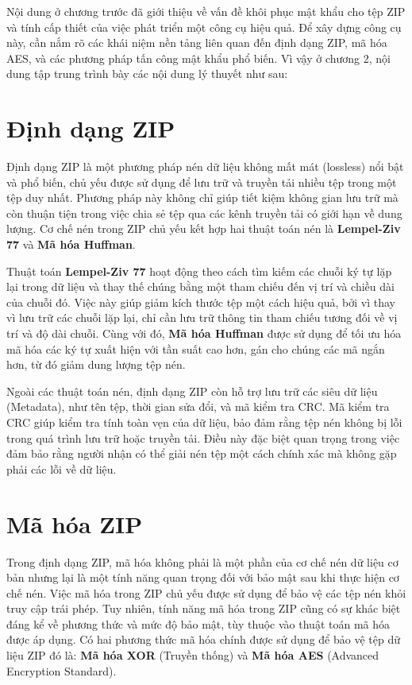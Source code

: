 \documentclass[../DoAn.tex]{subfiles}
\begin{document}
Nội dung ở chương trước đã giới thiệu về vấn đề khôi phục mật khẩu cho tệp ZIP và tính cấp thiết của việc phát triển một công cụ hiệu quả. Để xây dựng công cụ này, cần nắm rõ các khái niệm nền tảng liên quan đến định dạng ZIP, mã hóa AES, và các phương pháp tấn công mật khẩu phổ biến. Vì vậy ở chương 2, nội dung tập trung trình bày các nội dung lý thuyết như sau:

\section{Định dạng ZIP}
\label{section:2.1}
Định dạng ZIP là một phương pháp nén dữ liệu không mất mát (lossless) nổi bật và phổ biến, chủ yếu được sử dụng để lưu trữ và truyền tải nhiều tệp trong một tệp duy nhất. Phương pháp này không chỉ giúp tiết kiệm không gian lưu trữ mà còn thuận tiện trong việc chia sẻ tệp qua các kênh truyền tải có giới hạn về dung lượng. Cơ chế nén trong ZIP chủ yếu kết hợp hai thuật toán nén là \textbf{Lempel-Ziv 77} và \textbf{Mã hóa Huffman}. 

Thuật toán \textbf{Lempel-Ziv 77} hoạt động theo cách tìm kiếm các chuỗi ký tự lặp lại trong dữ liệu và thay thế chúng bằng một tham chiếu đến vị trí và chiều dài của chuỗi đó. Việc này giúp giảm kích thước tệp một cách hiệu quả, bởi vì thay vì lưu trữ các chuỗi lặp lại, chỉ cần lưu trữ thông tin tham chiếu tương đối về vị trí và độ dài chuỗi. Cùng với đó, \textbf{Mã hóa Huffman} được sử dụng để tối ưu hóa mã hóa các ký tự xuất hiện với tần suất cao hơn, gán cho chúng các mã ngắn hơn, từ đó giảm dung lượng tệp nén. 

Ngoài các thuật toán nén, định dạng ZIP còn hỗ trợ lưu trữ các siêu dữ liệu (Metadata), như tên tệp, thời gian sửa đổi, và mã kiểm tra CRC. Mã kiểm tra CRC giúp kiểm tra tính toàn vẹn của dữ liệu, bảo đảm rằng tệp nén không bị lỗi trong quá trình lưu trữ hoặc truyền tải. Điều này đặc biệt quan trọng trong việc đảm bảo rằng người nhận có thể giải nén tệp một cách chính xác mà không gặp phải các lỗi về dữ liệu.

\section{Mã hóa ZIP}
\label{section:2.2}
Trong định dạng ZIP, mã hóa không phải là một phần của cơ chế nén dữ liệu cơ bản nhưng lại là một tính năng quan trọng đối với bảo mật sau khi thực hiện cơ chế nén. Việc mã hóa trong ZIP chủ yếu được sử dụng để bảo vệ các tệp nén khỏi truy cập trái phép. Tuy nhiên, tính năng mã hóa trong ZIP cũng có sự khác biệt đáng kể về phương thức và mức độ bảo mật, tùy thuộc vào thuật toán mã hóa được áp dụng. Có hai phương thức mã hóa chính được sử dụng để bảo vệ tệp dữ liệu ZIP đó là: \textbf{Mã hóa XOR} (Truyền thống) và \textbf{Mã hóa AES} (Advanced Encryption Standard). 
\end{document}
